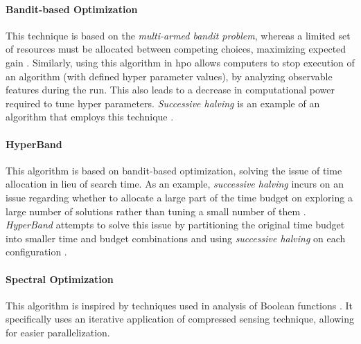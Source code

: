 \paragraph{Bandit-based Optimization}

This technique is based on the \textit{multi-armed bandit problem}, whereas a limited set of resources must be allocated between competing choices, maximizing expected gain \parencite{Katehakis1987TheMB}. Similarly, using this algorithm in \acrshort{hpo} allows computers to stop execution of an algorithm (with defined hyper parameter values), by analyzing observable features during the run. This also leads to a decrease in computational power required to tune hyper parameters. \textit{Successive halving} is an example of an algorithm that employs this technique \parencite{jamieson2015nonstochastic}.

\paragraph{HyperBand}

This algorithm is based on bandit-based optimization, solving the issue of time allocation in lieu of search time. As an example, \textit{successive halving} incurs on an issue regarding whether to allocate a large part of the time budget on exploring a large number of solutions rather than tuning a small number of them \parencite{elshawi2019automated}. \textit{HyperBand} attempts to solve this issue by partitioning the original time budget into smaller time and budget combinations and using \textit{successive halving} on each configuration \parencite{li2016hyperband}.

\paragraph{Spectral Optimization}

This algorithm is inspired by techniques used in analysis of Boolean functions \parencite{hazan2017hyperparameter}. It specifically uses an iterative application of compressed sensing technique, allowing for easier parallelization.
